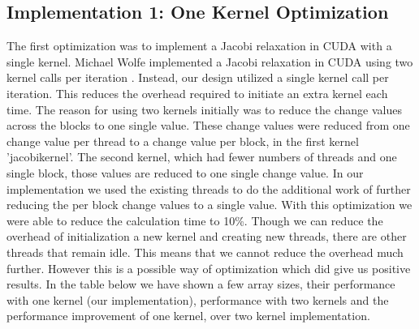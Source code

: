 \documentclass[10pt, twocolumn]{article}
\begin{document}
    \subsection{Implementation 1: One Kernel Optimization}
    The first optimization was to implement a Jacobi relaxation in CUDA with a single kernel.
    Michael Wolfe implemented a Jacobi relaxation in CUDA using two kernel calls per iteration \cite{michael}.
    Instead, our design utilized a single kernel call per iteration.
    This reduces the overhead required to initiate an extra kernel each time.
    The reason for using two kernels initially was to reduce the change values across the blocks to one single value.
    These change values were reduced from one change value per thread to a change value per block, in the first kernel 'jacobikernel'.
    The second kernel, which had fewer numbers of threads and one single block, those values are reduced to one single change value.
    In our implementation we used the existing threads to do the additional work of further reducing the per block change values to a single value.
    With this optimization we were able to reduce the calculation time to 10\%.
    Though we can reduce the overhead of initialization a new kernel and creating new threads, there are other threads that remain idle.
    This means that we cannot reduce the overhead much further.
    However this is a possible way of optimization which did give us positive results.
    In the table below we have shown a few array sizes, their performance with one kernel (our implementation), performance with two kernels \cite{michael} and the performance improvement of one kernel, over two kernel implementation.
\end{document}
